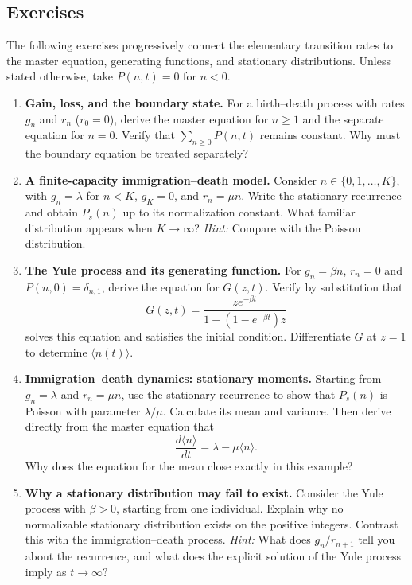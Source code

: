 \subsection{Exercises}
\label{exercises_1d_master}
The following exercises progressively connect the elementary transition rates to the master equation, generating functions, and stationary distributions. Unless stated otherwise, take $P(n,t)=0$ for $n<0$.
\begin{enumerate}
\item \textbf{Gain, loss, and the boundary state.} For a birth--death process with rates $g_n$ and $r_n$ ($r_0=0$), derive the master equation for $n\geq 1$ and the separate equation for $n=0$. Verify that $\sum_{n\geq0}P(n,t)$ remains constant. Why must the boundary equation be treated separately?

\item \textbf{A finite-capacity immigration--death model.} Consider $n\in\{0,1,\ldots,K\}$, with $g_n=\lambda$ for $n<K$, $g_K=0$, and $r_n=\mu n$. Write the stationary recurrence and obtain $P_s(n)$ up to its normalization constant. What familiar distribution appears when $K\to\infty$? \emph{Hint:} Compare with the Poisson distribution.

\item \textbf{The Yule process and its generating function.} For $g_n=\beta n$, $r_n=0$ and $P(n,0)=\delta_{n,1}$, derive the equation for $G(z,t)$. Verify by substitution that
\[
G(z,t)=\frac{ze^{-\beta t}}{1-(1-e^{-\beta t})z}
\]
solves this equation and satisfies the initial condition. Differentiate $G$ at $z=1$ to determine $\langle n(t)\rangle$.

\item \textbf{Immigration--death dynamics: stationary moments.} Starting from $g_n=\lambda$ and $r_n=\mu n$, use the stationary recurrence to show that $P_s(n)$ is Poisson with parameter $\lambda/\mu$. Calculate its mean and variance. Then derive directly from the master equation that
\[
\frac{d\langle n\rangle}{dt}=\lambda-\mu\langle n\rangle.
\]
Why does the equation for the mean close exactly in this example?

\item \textbf{Why a stationary distribution may fail to exist.} Consider the Yule process with $\beta>0$, starting from one individual. Explain why no normalizable stationary distribution exists on the positive integers. Contrast this with the immigration--death process. \emph{Hint:} What does $g_n/r_{n+1}$ tell you about the recurrence, and what does the explicit solution of the Yule process imply as $t\to\infty$?
\end{enumerate}
